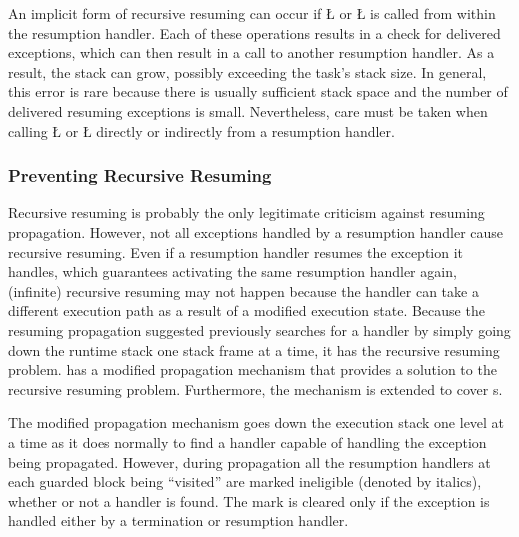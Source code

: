 \documentclass[openright,twoside]{report}
\begin{document}
\begin{annotation}
An implicit form of recursive resuming can occur if \LGinlinetrue\LGbegin\lgrinde\L{}\endlgrinde\LGend{} or \LGinlinetrue\LGbegin\lgrinde\L{}\endlgrinde\LGend{} is called from within the resumption handler.
Each of these operations results in a check for delivered exceptions, which can then result in a call to another resumption handler.
As a result, the stack can grow, possibly exceeding the task's stack size.
In general, this error is rare because there is usually sufficient stack space and the number of delivered resuming exceptions is small.
Nevertheless, care must be taken when calling \LGinlinetrue\LGbegin\lgrinde\L{}\endlgrinde\LGend{} or \LGinlinetrue\LGbegin\lgrinde\L{}\endlgrinde\LGend{} directly or indirectly from a resumption handler.
\end{annotation}


\subsubsection{Preventing Recursive Resuming}

Recursive resuming is probably the only legitimate criticism against resuming propagation.
However, not all exceptions handled by a resumption handler cause recursive resuming.
Even if a resumption handler resumes the exception it handles, which guarantees activating the same resumption handler again, (infinite) recursive resuming may not happen because the handler can take a different execution path as a result of a modified execution state.
Because the resuming propagation suggested previously searches for a handler by simply going down the runtime stack one stack frame at a time, it has the recursive resuming problem.
\uC has a modified propagation mechanism that provides a solution to the recursive resuming problem.
Furthermore, the mechanism is extended to cover s.

The modified propagation mechanism goes down the execution stack one level at a time as it does normally to find a handler capable of handling the exception being propagated.
However, during propagation all the resumption handlers at each guarded block being ``visited'' are marked ineligible (denoted by italics), whether or not a handler is found.
The mark is cleared only if the exception is handled either by a termination or resumption handler.
\end{document}
